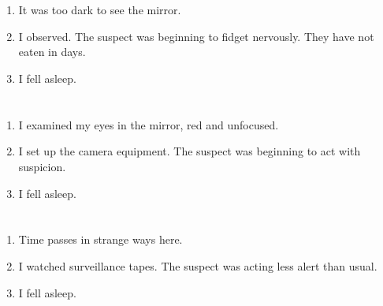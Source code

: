 \documentclass{article}
\begin{document}
    \newpage
    
    \section{}
    
    \begin{enumerate}
    
    \item It was too dark to see the mirror.\\
    
    \item I observed. The suspect was beginning to fidget nervously. They have not eaten in days.\\
    
    \item I fell asleep.\\
    
    \end{enumerate}
     
    \newpage
    
    \section{}
    
    \begin{enumerate}
    
    \item I examined my eyes in the mirror, red and unfocused.\\
    
    \item I set up the camera equipment. The suspect was beginning to act with suspicion.\\
    
    \item I fell asleep.\\
    
    \end{enumerate}
     
    \newpage
    
    \section{}
    
    \begin{enumerate}
    
    \item Time passes in strange ways here.\\
    
    \item I watched surveillance tapes. The suspect was acting less alert than usual.\\
    
    \item I fell asleep.\\
    
    \end{enumerate}
     
\end{document}
